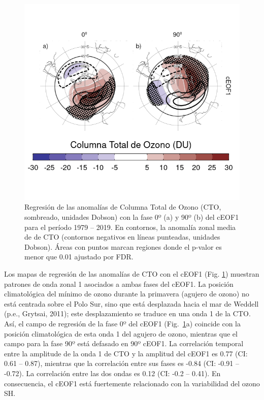 \documentclass[12pt,oneside]{reedthesis}
\begin{document}
\begin{figure}
\includegraphics{figures/20-ceofs/o3-regr-1} \caption{Regresión de las anomalías de Columna Total de Ozono (CTO, sombreado, unidades Dobson) con la fase 0º (a) y 90º (b) del cEOF1 para el período 1979 -- 2019.
En contornos, la anomalía zonal media de de CTO (contornos negativos en líneas punteadas, unidades Dobson).
Áreas con puntos marcan regiones donde el p-valor es menor que 0.01 ajustado por FDR.}\label{fig:o3-regr}
\end{figure}



Los mapas de regresión de las anomalías de CTO con el cEOF1 (Fig. \ref{fig:o3-regr}) muestran patrones de onda zonal 1 asociados a ambas fases del cEOF1.
La posición climatológica del mínimo de ozono durante la primavera (agujero de ozono) no está centrada sobre el Polo Sur, sino que está desplazada hacia el mar de Weddell (p.e., Grytsai, 2011); este desplazamiento se traduce en una onda 1 de la CTO.
Así, el campo de regresión de la fase 0º del cEOF1 (Fig.~\ref{fig:o3-regr}a) coincide con la posición climatológica de esta onda 1 del agujero de ozono, mientras que el campo para la fase 90º está defasado en 90º cEOF1.
La correlación temporal entre la amplitude de la onda 1 de CTO y la amplitud del cEOF1 es 0.77 (CI: 0.61 -- 0.87), mientras que la correlación entre sus fases es -0.84 (CI: -0.91 -- -0.72).
La correlación entre las dos ondas es 0.12 (CI: -0.2 -- 0.41).
En consecuencia, el cEOF1 está fuertemente relacionado con la variabilidad del ozono SH.
\end{document}

